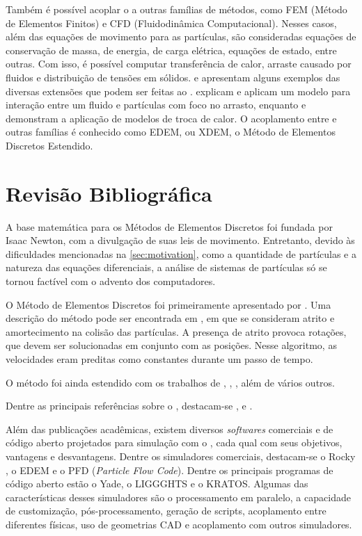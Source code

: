 Também é possível acoplar o \DEM{} a outras famílias de métodos, como FEM (Método de Elementos Finitos) e CFD (Fluidodinâmica Computacional). Nesses casos, além das equações de movimento para as partículas, são consideradas equações de conservação de massa, de energia, de carga elétrica, equações de estado, entre outras. Com isso, é possível computar transferência de calor, arraste causado por fluidos e distribuição de tensões em sólidos.  e  apresentam alguns exemplos das diversas extensões que podem ser feitas ao \DEM{}.  explicam e aplicam um modelo para interação entre um fluido e partículas com foco no arrasto, enquanto  e  demonstram a aplicação de modelos de troca de calor. O acoplamento entre \DEM{} e outras famílias é conhecido como EDEM, ou XDEM, o Método de Elementos Discretos Estendido.

\section{Revisão Bibliográfica}

A base matemática para os Métodos de Elementos Discretos foi fundada por Isaac Newton, com a divulgação de suas leis de movimento. Entretanto, devido às dificuldades mencionadas na \cref{sec:motivation}, como a quantidade de partículas e a natureza das equações diferenciais, a análise de sistemas de partículas só se tornou factível com o advento dos computadores.

O Método de Elementos Discretos foi primeiramente apresentado por . Uma descrição do método pode ser encontrada em , em que se consideram atrito e amortecimento na colisão das partículas. A presença de atrito provoca rotações, que devem ser solucionadas em conjunto com as posições. Nesse algoritmo, as velocidades eram preditas como constantes durante um passo de tempo.

O método foi ainda estendido com os trabalhos de , , , além de vários outros.

Dentre as principais referências sobre o \DEM{}, destacam-se ,  e .

Além das publicações acadêmicas, existem diversos \textit{softwares} comerciais e de código aberto projetados para simulação com o \DEM{}, cada qual com seus objetivos, vantagens e desvantagens. Dentre os simuladores comerciais, destacam-se o Rocky \DEM{}, o EDEM e o PFD (\textit{Particle Flow Code}). Dentre os principais programas de código aberto estão o Yade, o LIGGGHTS e o KRATOS. Algumas das características desses simuladores são o processamento em paralelo, a capacidade de customização, pós-processamento, geração de scripts, acoplamento entre diferentes físicas, uso de geometrias CAD e acoplamento com outros simuladores.

